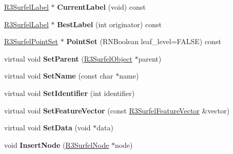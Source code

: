 \begin{DoxyCompactItemize}
\item 
\hyperlink{class_r3_surfel_label}{R3\+Surfel\+Label} $\ast$ {\bfseries Current\+Label} (void) const \hypertarget{class_r3_surfel_object_ab08930265d20e79b8407f7214110d164}{}\label{class_r3_surfel_object_ab08930265d20e79b8407f7214110d164}

\item 
\hyperlink{class_r3_surfel_label}{R3\+Surfel\+Label} $\ast$ {\bfseries Best\+Label} (int originator) const \hypertarget{class_r3_surfel_object_ad0d404d7cb9674dbf4ab84d98fd9a124}{}\label{class_r3_surfel_object_ad0d404d7cb9674dbf4ab84d98fd9a124}

\item 
\hyperlink{class_r3_surfel_point_set}{R3\+Surfel\+Point\+Set} $\ast$ {\bfseries Point\+Set} (R\+N\+Boolean leaf\+\_\+level=F\+A\+L\+SE) const \hypertarget{class_r3_surfel_object_ac46219d6bc372e1c1cffd54d1286fbd5}{}\label{class_r3_surfel_object_ac46219d6bc372e1c1cffd54d1286fbd5}

\item 
virtual void {\bfseries Set\+Parent} (\hyperlink{class_r3_surfel_object}{R3\+Surfel\+Object} $\ast$parent)\hypertarget{class_r3_surfel_object_abc42d36da2a791498005b3a509041bc1}{}\label{class_r3_surfel_object_abc42d36da2a791498005b3a509041bc1}

\item 
virtual void {\bfseries Set\+Name} (const char $\ast$name)\hypertarget{class_r3_surfel_object_a5b3a5814e4f3626d08028a9579ddf820}{}\label{class_r3_surfel_object_a5b3a5814e4f3626d08028a9579ddf820}

\item 
virtual void {\bfseries Set\+Identifier} (int identifier)\hypertarget{class_r3_surfel_object_a8dc9bdf685b522f2ac47cfddd4a62be4}{}\label{class_r3_surfel_object_a8dc9bdf685b522f2ac47cfddd4a62be4}

\item 
virtual void {\bfseries Set\+Feature\+Vector} (const \hyperlink{class_r3_surfel_feature_vector}{R3\+Surfel\+Feature\+Vector} \&vector)\hypertarget{class_r3_surfel_object_aec14e7d2ff8703d8447e7c0e5d34c1dc}{}\label{class_r3_surfel_object_aec14e7d2ff8703d8447e7c0e5d34c1dc}

\item 
virtual void {\bfseries Set\+Data} (void $\ast$data)\hypertarget{class_r3_surfel_object_a3b014b400fcedbcb2ee1211fc3114caa}{}\label{class_r3_surfel_object_a3b014b400fcedbcb2ee1211fc3114caa}

\item 
void {\bfseries Insert\+Node} (\hyperlink{class_r3_surfel_node}{R3\+Surfel\+Node} $\ast$node)\hypertarget{class_r3_surfel_object_a0916593df615305393f72fdaa2344b75}{}\label{class_r3_surfel_object_a0916593df615305393f72fdaa2344b75}


\end{DoxyCompactItemize}
